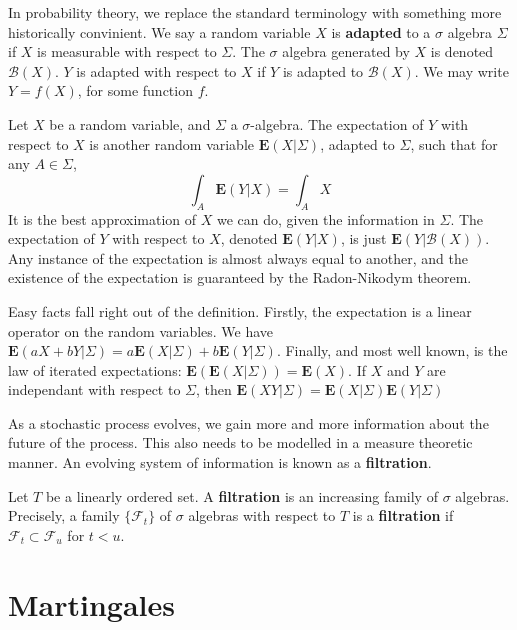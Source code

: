 In probability theory, we replace the standard terminology with something more historically convinient. We say a random variable $X$ is {\bf adapted} to a $\sigma$ algebra $\Sigma$ if $X$ is measurable with respect to $\Sigma$. The $\sigma$ algebra generated by $X$ is denoted $\mathcal{B}(X)$. $Y$ is adapted with respect to $X$ if $Y$ is adapted to $\mathcal{B}(X)$. We may write $Y = f(X)$, for some function $f$.

\begin{definition}
    Let $X$ be a random variable, and $\Sigma$ a $\sigma$-algebra. The expectation of $Y$ with respect to $X$ is another random variable $\mathbf{E}(X|\Sigma)$, adapted to $\Sigma$, such that for any $A \in \Sigma$,
    \[ \int_A \mathbf{E}(Y|X) = \int_A X \]
    It is the best approximation of $X$ we can do, given the information in $\Sigma$. The expectation of $Y$ with respect to $X$, denoted $\mathbf{E}(Y|X)$, is just $\mathbf{E}(Y|\mathcal{B}(X))$. Any instance of the expectation is almost always equal to another, and the existence of the expectation is guaranteed by the Radon-Nikodym theorem.
\end{definition}

Easy facts fall right out of the definition. Firstly, the expectation is a linear operator on the random variables. We have $\mathbf{E}(aX + bY | \Sigma) = a \mathbf{E}(X | \Sigma) + b \mathbf{E}(Y | \Sigma)$. Finally, and most well known, is the law of iterated expectations: $\mathbf{E}(\mathbf{E}(X | \Sigma)) = \mathbf{E}(X)$. If $X$ and $Y$ are independant with respect to $\Sigma$, then $\mathbf{E}(XY | \Sigma) = \mathbf{E}(X|\Sigma) \mathbf{E}(Y|\Sigma)$

As a stochastic process evolves, we gain more and more information about the future of the process. This also needs to be modelled in a measure theoretic manner. An evolving system of information is known as a {\bf filtration}.

\begin{definition}
    Let $T$ be a linearly ordered set. A {\bf filtration} is an increasing family of $\sigma$ algebras. Precisely, a family $\{ \mathcal{F}_t \}$ of $\sigma$ algebras with respect to $T$ is a {\bf filtration} if $\mathcal{F}_t \subset \mathcal{F}_u$ for $t < u$.
\end{definition}

\section{Martingales}

